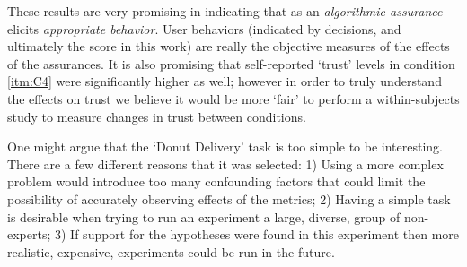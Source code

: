 These results are very promising in indicating that \famsec{} as an \emph{algorithmic assurance} elicits \emph{appropriate behavior}. User behaviors (indicated by decisions, and ultimately the score in this work) are really the objective measures of the effects of the assurances. It is also promising that self-reported `trust' levels in condition \ref{itm:C4} were significantly higher as well; however in order to truly understand the effects on trust we believe it would be more `fair' to perform a within-subjects study to measure changes in trust between conditions.

One might argue that the `Donut Delivery' task is too simple to be interesting. There are a few different reasons that it was selected: 1) Using a more complex problem would introduce too many confounding factors that could limit the possibility of accurately observing effects of the \famsec{} metrics; 2) Having a simple task is desirable when trying to run an experiment a large, diverse, group of non-experts; 3) If support for the hypotheses were found in this experiment then more realistic, expensive, experiments could be run in the future.

%
